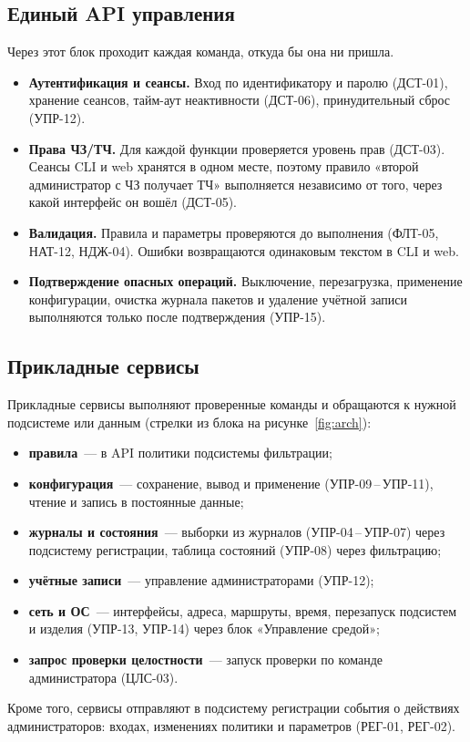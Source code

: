 \documentclass[12pt,a4paper,final]{article}
\begin{document}
\subsection{Единый API управления}

Через этот блок проходит каждая команда, откуда бы она ни пришла.
\begin{itemize}
\item \textbf{Аутентификация и сеансы.} Вход по идентификатору и паролю
  (ДСТ-01), хранение сеансов, тайм-аут неактивности (ДСТ-06), принудительный
  сброс (УПР-12).
\item \textbf{Права ЧЗ/ТЧ.} Для каждой функции проверяется уровень прав
  (ДСТ-03). Сеансы CLI и web хранятся в одном месте, поэтому правило
  «второй администратор с ЧЗ получает ТЧ» выполняется независимо от того,
  через какой интерфейс он вошёл (ДСТ-05).
\item \textbf{Валидация.} Правила и параметры проверяются до выполнения
  (ФЛТ-05, НАТ-12, НДЖ-04). Ошибки возвращаются одинаковым текстом в CLI и web.
\item \textbf{Подтверждение опасных операций.} Выключение, перезагрузка,
  применение конфигурации, очистка журнала пакетов и удаление учётной записи
  выполняются только после подтверждения (УПР-15).
\end{itemize}

\subsection{Прикладные сервисы}

Прикладные сервисы выполняют проверенные команды и обращаются к нужной
подсистеме или данным (стрелки из блока на рисунке~\ref{fig:arch}):
\begin{itemize}
\item \textbf{правила}~— в API политики подсистемы фильтрации;
\item \textbf{конфигурация}~— сохранение, вывод и применение (УПР-09\,--\,УПР-11),
  чтение и запись в постоянные данные;
\item \textbf{журналы и состояния}~— выборки из журналов (УПР-04\,--\,УПР-07)
  через подсистему регистрации, таблица состояний (УПР-08) через фильтрацию;
\item \textbf{учётные записи}~— управление администраторами (УПР-12);
\item \textbf{сеть и ОС}~— интерфейсы, адреса, маршруты, время, перезапуск
  подсистем и изделия (УПР-13, УПР-14) через блок «Управление средой»;
\item \textbf{запрос проверки целостности}~— запуск проверки по команде
  администратора (ЦЛС-03).
\end{itemize}
Кроме того, сервисы отправляют в подсистему регистрации события о действиях
администраторов: входах, изменениях политики и параметров (РЕГ-01, РЕГ-02).
\end{document}
